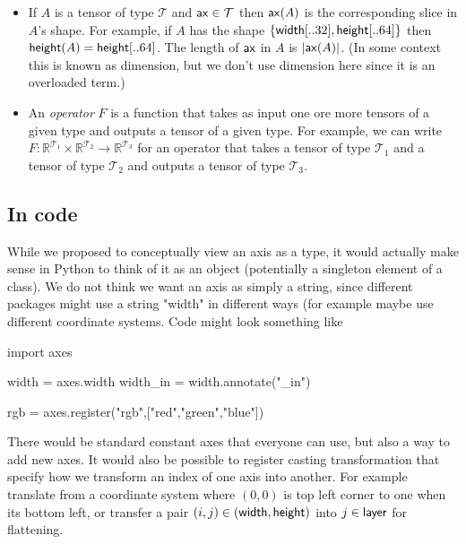 \documentclass{article}
\begin{document}
\begin{itemize}
  \item If $A$ is a tensor of type $\mathcal{T}$ and $\mathsf{ax} \in \mathcal{T}$ then $\mathsf{ax}(A)$ is the corresponding slice in $A$'s shape. For example, if $A$ has the shape $\{ \mathsf{width}[..32] , \mathsf{height}[..64] \}$ then $\mathsf{height}(A) = \mathsf{height}[..64]$. The length of $\mathsf{ax}$ in $A$ is $|\mathsf{ax}(A)|$. (In some context this is known as dimension, but we don't use dimension here since it is an overloaded term.) 
  
  \item An \emph{operator}  $F$ is a function that takes as input one ore more tensors of a given type and outputs a tensor of a given type. For example, we can write $F:\mathbb{R}^{\mathcal{T}_1} \times \mathbb{R}^{\mathcal{T}_2} \rightarrow \mathbb{R}^{\mathcal{T}_3}$ for an operator that takes a tensor of type $\mathcal{T}_1$ and a tensor of type $\mathcal{T}_2$ and outputs a tensor of type $\mathcal{T}_3$. 

  

\end{itemize}


\subsection{In code} 

While we proposed to conceptually view an axis as a type, it would actually make sense in Python to think of it as an object (potentially a singleton element of a class). 
We do not think we want an axis as simply a string, since different packages might use a string "width" in different ways (for example maybe use different coordinate systems. Code might look something like

\begin{python}
import axes

width = axes.width
width_in = width.annotate("_in")

rgb = axes.register("rgb",["red","green","blue"])
\end{python}

There would be standard constant axes that everyone can use, but also a way to add new axes.
It would also be possible to register casting transformation that specify how we transform an index of one axis into another. For example translate from a coordinate system where $(0,0)$ is top left corner to one when its bottom left, or transfer a pair $(i,j) \in (\mathsf{width},\mathsf{height})$ into $j \in \mathsf{layer}$ for flattening.
\end{document}
